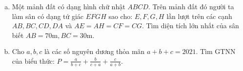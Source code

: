 \begin{ex} %
	\begin{enumerate}[a)]
		\item Một mảnh đất có dạng hình chữ nhật $ABCD$. Trên mảnh đất đó người ta làm sân có dạng tứ giác $EFGH$ sao cho: $E, F, G, H$ lần lượt trên các cạnh $AB, BC, CD, DA$ và $AE = AH = CF = CG$. Tìm diện tích lớn nhất của sân biết $AB = 70\text{m}, BC = 30\text{m}$.
		\item Cho $a, b, c$ là các số nguyên dương thỏa mãn $a+b+c=2021$.
		Tìm GTNN của biểu thức: $P = \frac{a}{b+c} + \frac{b}{c+a} + \frac{c}{a+b}$.
	\end{enumerate}
	\loigiai{}
\end{ex}

